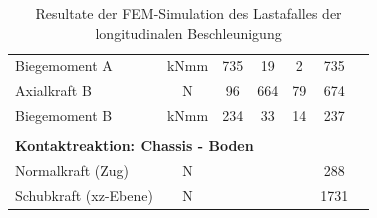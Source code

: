 \begin{table}[H]
\begin{tabular}{lcccccc}
  Biegemoment A	&	kNmm	&	735	&	19	&	2	&	735	&		\\
  Axialkraft B	&	N	&	96	&	664	&	79	&	674	&		\\
  Biegemoment B	&	kNmm	&	234	&	33	&	14	&	237	&		\\	\hline	\\
  \multicolumn{5}{l}{\textbf{Kontaktreaktion: Chassis - Boden}}									&		&		\\	\thickhline
  Normalkraft (Zug)	&	N	&		&		&		&	288	&		\\
  Schubkraft (xz-Ebene)	&	N	&		&		&		&	1731	&		\\	\hline
  \end{tabular}
  \caption{Resultate der FEM-Simulation des Lastafalles der longitudinalen Beschleunigung}
  \label{tab:FEM 1.3}
  \end{table}



